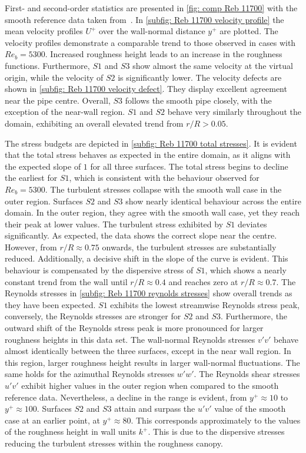 First- and second-order statistics are presented in \autoref{fig: comp Reb 11700} with the smooth reference data taken from~\cite{elkhouryDirectNumericalSimulation2013}.
In \autoref{subfig: Reb 11700 velocity profile} the mean velocity profiles $U^+$ over the wall-normal distance $y^+$ are plotted.
The velocity profiles demonstrate a comparable trend to those observed in cases with $Re_b = 5300$.
Increased roughness height leads to an increase in the roughness functions.
Furthermore, $S1$ and $S3$ show almost the same velocity at the virtual origin, while the velocity of $S2$ is significantly lower.
The velocity defects are shown in \autoref{subfig: Reb 11700 velocity defect}.
They display excellent agreement near the pipe centre.
Overall, $S3$ follows the smooth pipe closely, with the exception of the near-wall region.
$S1$ and $S2$ behave very similarly throughout the domain, exhibiting an overall elevated trend from $r/R > 0.05$.

The stress budgets are depicted in \autoref{subfig: Reb 11700 total stresses}.
It is evident that the total stress behaves as expected in the entire domain, as it aligns with the expected slope of $1$ for all three surfaces.
The total stress begins to decline the earliest for $S1$, which is consistent with the behaviour observed for $Re_b = 5300$.
The turbulent stresses collapse with the smooth wall case in the outer region.
Surfaces $S2$ and $S3$ show nearly identical behaviour across the entire domain.
In the outer region, they agree with the smooth wall case, yet they reach their peak at lower values.
The turbulent stress exhibited by $S1$ deviates significantly.
As expected, the data shows the correct slope near the centre.
However, from $r/R \approx 0.75$ onwards, the turbulent stresses are substantially reduced.
Additionally, a decisive shift in the slope of the curve is evident.
This behaviour is compensated by the dispersive stress of $S1$, which shows a nearly constant trend from the wall until $r/R \approx 0.4$ and reaches zero at $r/R \approx 0.7$.
The Reynolds stresses in \autoref{subfig: Reb 11700 reynolds stresses} show overall trends as they have been expected.
$S1$ exhibits the lowest streamwise Reynolds stress peak, conversely, the Reynolds stresses are stronger for $S2$ and $S3$.
Furthermore, the outward shift of the Reynolds stress peak is more pronounced for larger roughness heights in this data set.
The wall-normal Reynolds stresses $v'v'$ behave almost identically between the three surfaces, except in the near wall region.
In this region, larger roughness height results in larger  wall-normal fluctuations.
The same holds for the azimuthal Reynolds stresses $w'w'$.
The Reynolds shear stresses $u'v'$ exhibit higher values in the outer region when compared to the smooth reference data.
Nevertheless, a decline in the range is evident, from $y^+ \approx 10$ to $y^+ \approx 100$.
Surfaces $S2$ and $S3$ attain and surpass the $u'v'$ value of the smooth case at an earlier point, at $y^+ \approx 80$.
This corresponds approximately to the values of the roughness height in wall units $k^+$.
This is due to the dispersive stresses reducing the turbulent stresses within the roughness  canopy.


